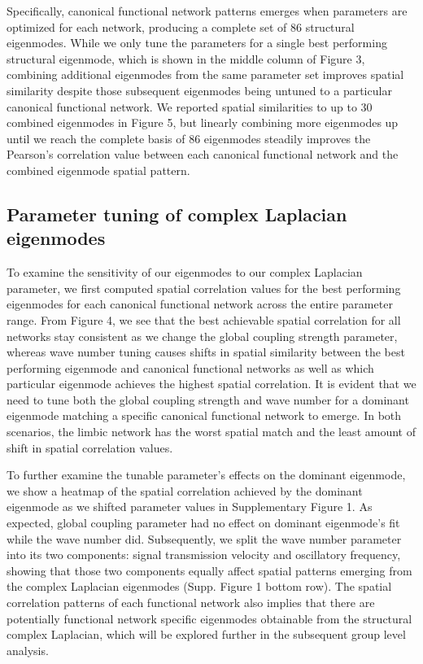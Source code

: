 \documentclass{article}
\begin{document}
Specifically, canonical functional network patterns emerges when parameters are optimized for each network, producing a complete set of 86 structural eigenmodes. While we only tune the parameters for a single best performing structural eigenmode, which is shown in the middle column of Figure 3, combining additional eigenmodes from the same parameter set improves spatial similarity despite those subsequent eigenmodes being untuned to a particular canonical functional network. We reported spatial similarities to up to 30 combined eigenmodes in Figure 5, but linearly combining more eigenmodes up until we reach the complete basis of 86 eigenmodes steadily improves the Pearson's correlation value between each canonical functional network and the combined eigenmode spatial pattern.


\subsection{Parameter tuning of complex Laplacian eigenmodes}
To examine the sensitivity of our eigenmodes to our complex Laplacian parameter, we first computed spatial correlation values for the best performing eigenmodes for each canonical functional network across the entire parameter range. From Figure 4, we see that the best achievable spatial correlation for all networks stay consistent as we change the global coupling strength parameter, whereas wave number tuning causes shifts in spatial similarity between the best performing eigenmode and canonical functional networks as well as which particular eigenmode achieves the highest spatial correlation. It is evident that we need to tune both the global coupling strength and wave number for a dominant eigenmode matching a specific canonical functional network to emerge. In both scenarios, the limbic network has the worst spatial match and the least amount of shift in spatial correlation values. 

To further examine the tunable parameter's effects on the dominant eigenmode, we show a heatmap of the spatial correlation achieved by the dominant eigenmode as we shifted parameter values in Supplementary Figure 1. As expected, global coupling parameter had no effect on dominant eigenmode's fit while the wave number did. Subsequently, we split the wave number parameter into its two components: signal transmission velocity and oscillatory frequency, showing that those two components equally affect spatial patterns emerging from the complex Laplacian eigenmodes (Supp. Figure 1 bottom row). The spatial correlation patterns of each functional network also implies that there are potentially functional network specific eigenmodes obtainable from the structural complex Laplacian, which will be explored further in the subsequent group level analysis.
\end{document}

